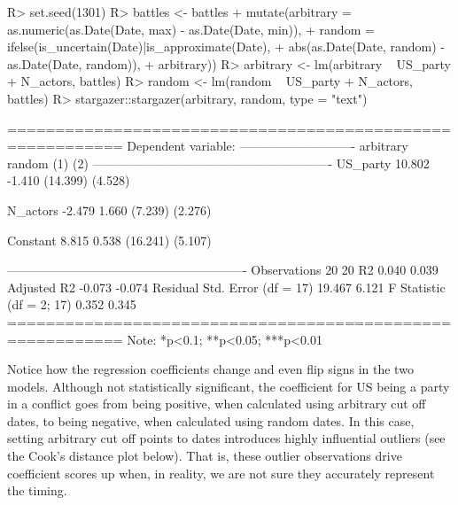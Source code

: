 \documentclass[
]{jss}
\begin{document}
\begin{CodeChunk}
\begin{CodeInput}
R> set.seed(1301)
R> battles <- battles %
+   mutate(arbitrary = as.numeric(as.Date(Date, max) - as.Date(Date, min)),
+          random = ifelse(is_uncertain(Date)|is_approximate(Date),
+                          abs(as.Date(Date, random) - as.Date(Date, random)),
+                          arbitrary))
R> arbitrary <- lm(arbitrary ~ US_party + N_actors, battles)
R> random <- lm(random ~ US_party + N_actors, battles)
R> stargazer::stargazer(arbitrary, random, type = "text")
\end{CodeInput}
\begin{CodeOutput}

==========================================================
                                  Dependent variable:     
                              ----------------------------
                                 arbitrary       random   
                                    (1)           (2)     
----------------------------------------------------------
US_party                          10.802         -1.410   
                                 (14.399)       (4.528)   
                                                          
N_actors                          -2.479         1.660    
                                  (7.239)       (2.276)   
                                                          
Constant                           8.815         0.538    
                                 (16.241)       (5.107)   
                                                          
----------------------------------------------------------
Observations                        20             20     
R2                                 0.040         0.039    
Adjusted R2                       -0.073         -0.074   
Residual Std. Error (df = 17)     19.467         6.121    
F Statistic (df = 2; 17)           0.352         0.345    
==========================================================
Note:                          *p<0.1; **p<0.05; ***p<0.01
\end{CodeOutput}
\end{CodeChunk}

Notice how the regression coefficients change and even flip signs in the
two models. Although not statistically significant, the coefficient for
US being a party in a conflict goes from being positive, when calculated
using arbitrary cut off dates, to being negative, when calculated using
random dates. In this case, setting arbitrary cut off points to dates
introduces highly influential outliers (see the Cook's distance plot
below). That is, these outlier observations drive coefficient scores up
when, in reality, we are not sure they accurately represent the timing.
\end{document}
